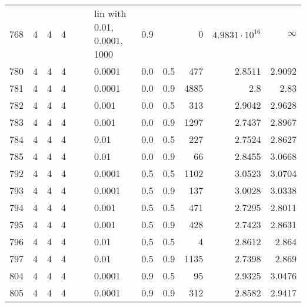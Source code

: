 \begin{longtable}{lrrrrrlrrrrr}
  768 &       4 & 4 & 4 &   &   & lin with 0.01, 0.0001, 1000 &      0.9 &        &       0 &  $4.9831\cdot 10^{16}$ &               $\infty$ \\
  780 &       4 & 4 & 4 &   &   &                      0.0001 &      0.0 &    0.5 &     477 &                 2.8511 &                 2.9092 \\
  781 &       4 & 4 & 4 &   &   &                      0.0001 &      0.0 &    0.9 &    4885 &                    2.8 &                   2.83 \\
  782 &       4 & 4 & 4 &   &   &                       0.001 &      0.0 &    0.5 &     313 &                 2.9042 &                 2.9628 \\
  783 &       4 & 4 & 4 &   &   &                       0.001 &      0.0 &    0.9 &    1297 &                 2.7437 &                 2.8967 \\
  784 &       4 & 4 & 4 &   &   &                        0.01 &      0.0 &    0.5 &     227 &                 2.7524 &                 2.8627 \\
  785 &       4 & 4 & 4 &   &   &                        0.01 &      0.0 &    0.9 &      66 &                 2.8455 &                 3.0668 \\
  792 &       4 & 4 & 4 &   &   &                      0.0001 &      0.5 &    0.5 &    1102 &                 3.0523 &                 3.0704 \\
  793 &       4 & 4 & 4 &   &   &                      0.0001 &      0.5 &    0.9 &     137 &                 3.0028 &                 3.0338 \\
  794 &       4 & 4 & 4 &   &   &                       0.001 &      0.5 &    0.5 &     471 &                 2.7295 &                 2.8011 \\
  795 &       4 & 4 & 4 &   &   &                       0.001 &      0.5 &    0.9 &     428 &                 2.7423 &                 2.8631 \\
  796 &       4 & 4 & 4 &   &   &                        0.01 &      0.5 &    0.5 &       4 &                 2.8612 &                  2.864 \\
  797 &       4 & 4 & 4 &   &   &                        0.01 &      0.5 &    0.9 &    1135 &                 2.7398 &                  2.869 \\
  804 &       4 & 4 & 4 &   &   &                      0.0001 &      0.9 &    0.5 &      95 &                 2.9325 &                 3.0476 \\
  805 &       4 & 4 & 4 &   &   &                      0.0001 &      0.9 &    0.9 &     312 &                 2.8582 &                 2.9417 \\

\end{longtable}

